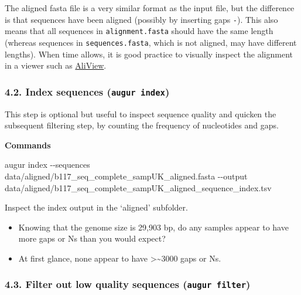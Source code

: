 \documentclass[
]{book}
\newenvironment{Shaded}{\begin{snugshade}}{\end{snugshade}}
\newcommand{\AttributeTok}[1]{\textcolor[rgb]{0.13,0.29,0.53}{#1}}
\newcommand{\ExtensionTok}[1]{#1}
\newcommand{\NormalTok}[1]{#1}
\providecommand{\tightlist}{%
  \setlength{\itemsep}{0pt}\setlength{\parskip}{0pt}}
\begin{document}
The aligned fasta file is a very similar format as the input file, but the difference is that sequences have been aligned (possibly by inserting gaps \texttt{-}). This also means that all sequences in \texttt{alignment.fasta} should have the same length (whereas sequences in \texttt{sequences.fasta}, which is not aligned, may have different lengths). When time allows, it is good practice to visually inspect the alignment in a viewer such as \href{https://github.com/AliView/AliView}{AliView}.

\subsubsection{\texorpdfstring{4.2. Index sequences (\texttt{augur\ index})}{4.2. Index sequences (augur index)}}\label{index-sequences-augur-index}

This step is optional but useful to inspect sequence quality and quicken the subsequent filtering step, by counting the frequency of nucleotides and gaps.

\textbf{Commands}

\begin{Shaded}
\begin{Highlighting}[]
\ExtensionTok{augur}\NormalTok{ index }\AttributeTok{{-}{-}sequences}\NormalTok{ data/aligned/b117\_seq\_complete\_sampUK\_aligned.fasta  }\AttributeTok{{-}{-}output}\NormalTok{  data/aligned/b117\_seq\_complete\_sampUK\_aligned\_sequence\_index.tsv}
\end{Highlighting}
\end{Shaded}

Inspect the index output in the `aligned' subfolder.

\begin{itemize}
\tightlist
\item
  Knowing that the genome size is 29,903 bp, do any samples appear to have more gaps or Ns than you would expect?
\end{itemize}

\begin{itemize}
\tightlist
\item
  At first glance, none appear to have \textgreater\textasciitilde3000 gaps or Ns.
\end{itemize}

\subsubsection{\texorpdfstring{4.3. Filter out low quality sequences (\texttt{augur\ filter})}{4.3. Filter out low quality sequences (augur filter)}}\label{filter-out-low-quality-sequences-augur-filter}
\end{document}
